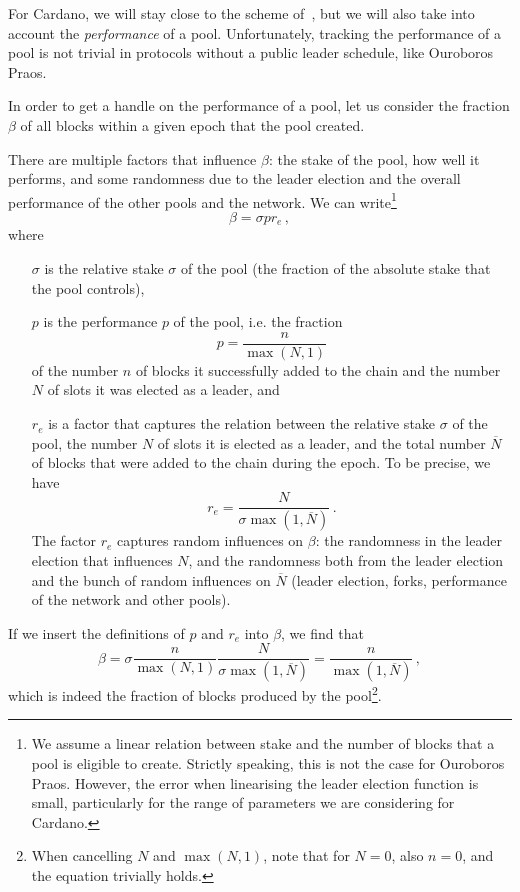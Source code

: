 \documentclass[11pt,a4paper,dvipsnames,twosided]{article}
\newcommand\Nbar{\overline{N}}
\begin{document}
For Cardano, we will stay close to the scheme of~\citep{bkks2018}, but we will
also take into account the \emph{performance} of a pool. Unfortunately, tracking
the performance of a pool is not trivial in protocols without a public leader
schedule, like Ouroboros Praos.

In order to get a handle on the performance of a pool, let us consider the
fraction \(\beta\) of all blocks within a given epoch that the pool created.

There are multiple factors that influence \(\beta\): the stake of the pool, how
well it performs, and some randomness due to the leader election and the overall
performance of the other pools and the network. We can write\footnote{We assume
  a linear relation between stake and the number of blocks that a pool is
  eligible to create. Strictly speaking, this is not the case for Ouroboros
  Praos. However, the error when linearising the leader election function is
  small, particularly for the range of parameters we are considering for
  Cardano.}
\[\beta = \sigma p r_e \,,\]
where
\begin{enumerate}
\item[\(\sigma\)] is the relative stake \(\sigma\) of the pool (the fraction of
  the absolute stake that the pool controls),
\item[\(p\)] is the performance \(p\) of the pool, i.e. the fraction
  \[
  p = \frac{n}{\max(N,1)}
  \]
  of the number \(n\) of blocks it successfully added to the chain and the
  number \(N\) of slots it was elected as a leader, and
\item[\(r_e\)] is a factor that captures the relation between the relative stake
  \(\sigma\) of the pool, the number \(N\) of slots it is elected as a leader,
  and the total number \(\Nbar\) of blocks that were added to the chain during
  the epoch. To be precise, we have
  \[r_e = \frac{N}{\sigma \max(1, \Nbar)}\,.\]
  The factor \(r_e\) captures random influences on \(\beta\): the
  randomness in the leader election that influences \(N\), and the randomness
  both from the leader election and the bunch of random influences on
  \(\Nbar\) (leader election, forks, performance of the network and other
  pools).
\end{enumerate}

If we insert the definitions of \(p\) and \(r_e\) into \(\beta\), we find that
\[
\beta = \sigma \frac{n}{\max(N,1)} \frac{N}{\sigma \max(1, \Nbar)}
= \frac{n}{\max(1, \Nbar)}\,,
\]
which is indeed the fraction of blocks produced by the pool\footnote{When
  cancelling \(N\) and \(\max(N,1)\), note that for \(N=0\), also \(n=0\), and
  the equation trivially holds.}.
\end{document}
